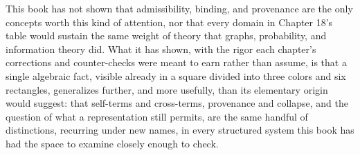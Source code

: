\documentclass[11pt]{book}
\begin{document}
This book has not shown that admissibility, binding, and provenance are the only concepts worth this kind of attention, nor that every domain in Chapter 18's table would sustain the same weight of theory that graphs, probability, and information theory did. What it has shown, with the rigor each chapter's corrections and counter-checks were meant to earn rather than assume, is that a single algebraic fact, visible already in a square divided into three colors and six rectangles, generalizes further, and more usefully, than its elementary origin would suggest: that self-terms and cross-terms, provenance and collapse, and the question of what a representation still permits, are the same handful of distinctions, recurring under new names, in every structured system this book has had the space to examine closely enough to check.
\end{document}
